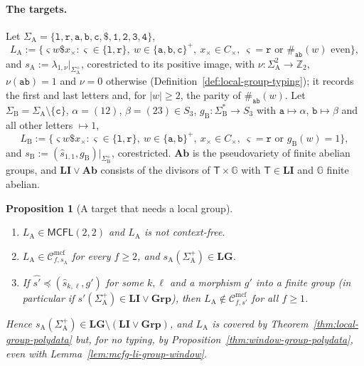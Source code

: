 \documentclass[11pt]{article}
\numberwithin{equation}{section}
\theoremstyle{plain}
\newtheorem{proposition}[theorem]{Proposition}
\theoremstyle{definition}
\theoremstyle{remark}
\newcommand{\Cmcf}[2]{\mathcal{C}^{\mathrm{mcf}}_{#1,#2}}
\theoremstyle{plain}
\begin{document}
\paragraph{The targets.}
Let $\Sigma_{\mathrm A}=\{\mathtt l,\mathtt r,\mathtt a,\mathtt b,\mathtt c,\mathtt\$,
\mathtt 1,\mathtt 2,\mathtt 3,\mathtt 4\}$,
\[
 L_{\mathrm A}:=\{\varsigma w\mathtt\$x_\times:\varsigma\in\{\mathtt l,\mathtt r\},\
 w\in\{\mathtt a,\mathtt b,\mathtt c\}^+,\ x_\times\in C_\times,\
 \varsigma=\mathtt r\text{ or }\#_{\mathtt{ab}}(w)\text{ even}\},
\]
and $s_{\mathrm A}:=\lambda_{1,\nu}|_{\Sigma_{\mathrm A}^+}$, corestricted to its positive image, with
$\nu:\Sigma_{\mathrm A}^2\to\mathbb Z_2$, $\nu(\mathtt{ab})=1$ and $\nu=0$ otherwise
(Definition~\ref{def:local-group-typing}); it records the first and last letters and,
for $|w|\ge2$, the parity of $\#_{\mathtt{ab}}(w)$.  Let
$\Sigma_{\mathrm B}=\Sigma_{\mathrm A}\setminus\{\mathtt c\}$, $\alpha=(12)$,
$\beta=(23)\in S_3$, $g_{\mathrm B}:\Sigma_{\mathrm B}^*\to S_3$ with
$\mathtt a\mapsto\alpha$, $\mathtt b\mapsto\beta$ and all other letters $\mapsto1$,
\[
 L_{\mathrm B}:=\{\varsigma w\mathtt\$x_\times:\varsigma\in\{\mathtt l,\mathtt r\},\
 w\in\{\mathtt a,\mathtt b\}^+,\ x_\times\in C_\times,\
 \varsigma=\mathtt r\text{ or }g_{\mathrm B}(w)=1\},
\]
and $s_{\mathrm B}:=(\widehat s_{1,1},g_{\mathrm B})|_{\Sigma_{\mathrm B}^+}$, corestricted.
$\mathbf{Ab}$ is the pseudovariety of finite abelian groups, and
$\mathbf{LI}\vee\mathbf{Ab}$ consists of the divisors of $\mathsf T\times {\mathbb G}$ with
$\mathsf T\in\mathbf{LI}$ and ${\mathbb G}$ finite abelian.

\begin{proposition}[A target that needs a local group]
\label{prop:lg-needed-target}
\begin{enumerate}[label=\textup{(\roman*)},leftmargin=*]
\item $L_{\mathrm A}\in\mathsf{MCFL}(2,2)$ and $L_{\mathrm A}$ is not context-free.
\item $L_{\mathrm A}\in\Cmcf{f}{s_{\mathrm A}}$ for every $f\ge2$, and
$s_{\mathrm A}(\Sigma_{\mathrm A}^+)\in\mathbf{LG}$.
\item If $\widehat{s'}\preceq(\widehat s_{k,\ell},g')$ for some $k,\ell$ and a
morphism $g'$ into a finite group (in particular if
$s'(\Sigma_{\mathrm A}^+)\in\mathbf{LI}\vee\mathbf{Grp}$), then
$L_{\mathrm A}\notin\Cmcf{f}{s'}$ for all $f\ge1$.
\end{enumerate}
Hence $s_{\mathrm A}(\Sigma_{\mathrm A}^+)\in\mathbf{LG}\setminus(\mathbf{LI}\vee\mathbf{Grp})$,
and $L_{\mathrm A}$ is covered by Theorem~\ref{thm:local-group-polydata} but, for no
typing, by Proposition~\ref{thm:window-group-polydata}, even with
Lemma~\ref{lem:mcfg-li-group-window}.
\end{proposition}
\end{document}
